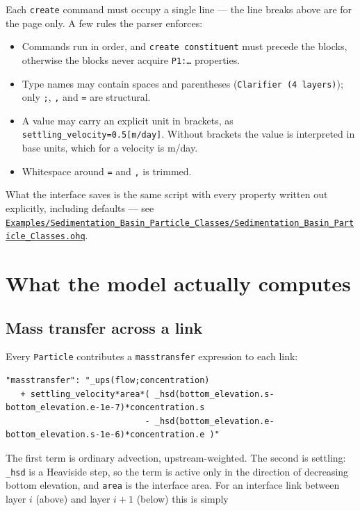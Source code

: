 \documentclass[11pt,a4paper]{article}
\newcommand{\code}[1]{\texttt{\small #1}}
\newcommand{\file}[1]{\texttt{\small #1}}
\newcommand{\ghbase}{https://github.com/ArashMassoudieh/OpenHydroQual/blob/master}
\newcommand{\exfile}[1]{\href{\ghbase/#1}{\file{#1}}}
\begin{document}
\noindent
Each \code{create} command must occupy a single line --- the line breaks above
are for the page only. A few rules the parser enforces:

\begin{itemize}[leftmargin=1.4em]
\item Commands run in order, and \code{create constituent} must precede the
      blocks, otherwise the blocks never acquire \code{P1:\ldots} properties.
\item Type names may contain spaces and parentheses
      (\code{Clarifier (4 layers)}); only \code{;}, \code{,} and \code{=} are
      structural.
\item A value may carry an explicit unit in brackets, as
      \code{settling\_velocity=0.5[m/day]}. Without brackets the value is
      interpreted in base units, which for a velocity is m/day.
\item Whitespace around \code{=} and \code{,} is trimmed.
\end{itemize}

What the interface saves is the same script with every property written out
explicitly, including defaults --- see
\exfile{Examples/Sedimentation\_Basin\_Particle\_Classes/Sedimentation\_Basin\_Particle\_Classes.ohq}.

\section{What the model actually computes}
\label{sec:physics}

\subsection{Mass transfer across a link}

Every \code{Particle} contributes a \code{masstransfer} expression to each link:

\begin{lstlisting}
"masstransfer": "_ups(flow;concentration)
   + settling_velocity*area*( _hsd(bottom_elevation.s-bottom_elevation.e-1e-7)*concentration.s
                            - _hsd(bottom_elevation.e-bottom_elevation.s-1e-6)*concentration.e )"
\end{lstlisting}

The first term is ordinary advection, upstream-weighted. The second is settling:
\code{\_hsd} is a Heaviside step, so the term is active only in the direction of
decreasing bottom elevation, and \code{area} is the interface area. For an
interface link between layer $i$ (above) and layer $i+1$ (below) this is simply
\end{document}
